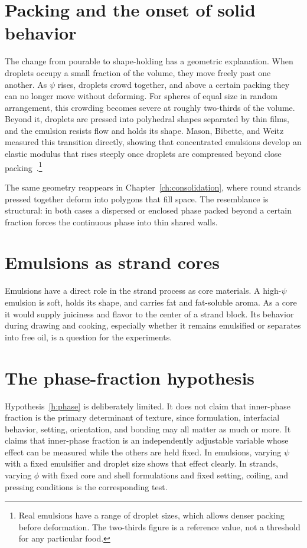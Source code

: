 \documentclass[11pt,openany]{book}
\theoremstyle{definition}
\begin{document}
\section{Packing and the onset of solid behavior}

The change from pourable to shape-holding has a geometric explanation. When droplets occupy a small fraction of the volume, they move freely past one another. As $\psi$ rises, droplets crowd together, and above a certain packing they can no longer move without deforming. For spheres of equal size in random arrangement, this crowding becomes severe at roughly two-thirds of the volume. Beyond it, droplets are pressed into polyhedral shapes separated by thin films, and the emulsion resists flow and holds its shape. Mason, Bibette, and Weitz measured this transition directly, showing that concentrated emulsions develop an elastic modulus that rises steeply once droplets are compressed beyond close packing~\cite{mason1995}.\footnote{Real emulsions have a range of droplet sizes, which allows denser packing before deformation. The two-thirds figure is a reference value, not a threshold for any particular food.}

The same geometry reappears in Chapter~\ref{ch:consolidation}, where round strands pressed together deform into polygons that fill space. The resemblance is structural: in both cases a dispersed or enclosed phase packed beyond a certain fraction forces the continuous phase into thin shared walls.

\section{Emulsions as strand cores}

Emulsions have a direct role in the strand process as core materials. A high-$\psi$ emulsion is soft, holds its shape, and carries fat and fat-soluble aroma. As a core it would supply juiciness and flavor to the center of a strand block. Its behavior during drawing and cooking, especially whether it remains emulsified or separates into free oil, is a question for the experiments.

\section{The phase-fraction hypothesis}

Hypothesis~\ref{h:phase} is deliberately limited. It does not claim that inner-phase fraction is the primary determinant of texture, since formulation, interfacial behavior, setting, orientation, and bonding may all matter as much or more. It claims that inner-phase fraction is an independently adjustable variable whose effect can be measured while the others are held fixed. In emulsions, varying $\psi$ with a fixed emulsifier and droplet size shows that effect clearly. In strands, varying $\phi$ with fixed core and shell formulations and fixed setting, coiling, and pressing conditions is the corresponding test.
\end{document}
